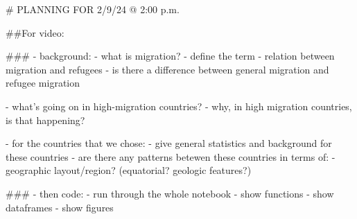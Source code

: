 # PLANNING FOR 2/9/24 @ 2:00 p.m.

##For video: 

### - background: 
  - what is migration? 
    - define the term 
    - relation between migration and refugees
    - is there a difference between general migration and refugee migration 

  - what's going on in high-migration countries? 
    - why, in high migration countries, is that happening? 

  - for the countries that we chose: 
    - give general statistics and background for these countries 
    - are there any patterns betewen these countries in terms of: 
      - geographic layout/region? (equatorial? geologic features?) 
  
### - then code: 
  - run through the whole notebook
  - show functions
  - show dataframes
  - show figures

